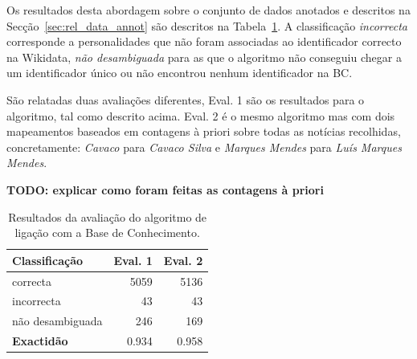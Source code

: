 \documentclass[a4paper, twocolumn, 11pt, twoside]{article}
\begin{document}

Os resultados desta abordagem sobre o conjunto de dados anotados e descritos na Secção~\ref{sec:rel_data_annot} são descritos na Tabela~\ref{tab:ent_linking_results}. A classificação \textit{incorrecta} corresponde a personalidades que não foram associadas ao identificador correcto na Wikidata, \textit{não desambiguada} para as que o algoritmo não conseguiu chegar a um identificador único ou não encontrou nenhum identificador na BC.

São relatadas duas avaliações diferentes, Eval. 1 são os resultados para o algoritmo, tal como descrito acima. Eval. 2 é o mesmo algoritmo mas com dois mapeamentos baseados em contagens à priori sobre todas as notícias recolhidas, concretamente: \textit{Cavaco} para \textit{Cavaco Silva} e \textit{Marques Mendes} para \textit{Luís Marques Mendes}.

\textbf{TODO: explicar como foram feitas as contagens à priori}


\begin{table}
    \begin{center}
    \begin{tabular}{l rr}
        {\bf Classificação} & {\bf Eval. 1} & {\bf Eval. 2} \\
        \hline
        correcta            &   5059        &  5136    \\
        incorrecta          &     43        &    43    \\
		não desambiguada    &    246        &   169    \\    
        \hline
		{\bf Exactidão }    &  0.934	    &  0.958   \\
    \end{tabular}
	\caption{Resultados da avaliação do algoritmo de ligação com a Base de Conhecimento.}
	\label{tab:ent_linking_results}
	\end{center}
\end{table}
\end{document}
